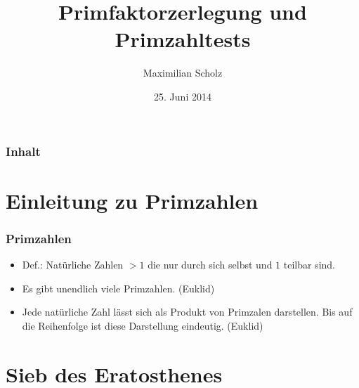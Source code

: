 \documentclass[mathserif, compress, german]{beamer}
\title{Primfaktorzerlegung und Primzahltests}    %
\author{Maximilian Scholz}                 %
\institute{Proseminar Mathematik}      %
\date{25. Juni 2014}                    %
\begin{document}
\begin{frame}
  \titlepage
\end{frame}

\section[]{}

\begin{frame}
  \frametitle{Inhalt}
  \tableofcontents
\end{frame}

\section{Einleitung zu Primzahlen}
  
\begin{frame}
  \frametitle{Primzahlen}
  \begin{itemize}
    \item Def.: Nat\"urliche Zahlen $> 1$ die nur durch sich selbst und $1$ teilbar sind.
      \vspace{3mm}
    \item Es gibt unendlich viele Primzahlen. (Euklid)
      \vspace{3mm}
    \item Jede nat\"urliche Zahl l\"asst sich als Produkt von Primzalen darstellen. 
	  Bis auf die Reihenfolge ist diese Darstellung eindeutig. (Euklid)
  \end{itemize}
\end{frame}

\section{Sieb des Eratosthenes}
\end{document}
